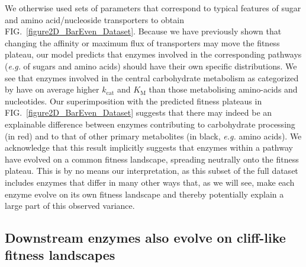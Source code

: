 \documentclass[nogrid,crop,final]{MBE2}%
\begin{document}
We otherwise used sets of parameters that correspond to typical features of sugar and amino acid/nucleoside transporters to obtain FIG.~\ref{figure2D_BarEven_Dataset}. Because we have previously shown that changing the affinity or maximum flux of transporters may move the fitness plateau, our model predicts that enzymes involved in the corresponding pathways (\textit{e.g.} of sugars and amino acids) should have their own specific distributions. We see that enzymes involved in the central carbohydrate metabolism as categorized by \citet{Bar-Even11} have on average higher $k_\text{cat}$ and $K_\text{M}$ than those metabolising amino-acids and nucleotides. Our superimposition with the predicted fitness plateaus in FIG.~\ref{figure2D_BarEven_Dataset} suggests that there may indeed be an explainable difference between enzymes contributing to carbohydrate processing (in red) and to that of other primary metabolites (in black, \textit{e.g.} amino acids).
We acknowledge that this result implicitly suggests that enzymes within a pathway have evolved on a common fitness landscape, spreading neutrally onto the fitness plateau. This is by no means our interpretation, as this subset of the full dataset includes enzymes that differ in many other ways that, as we will see, make each enzyme evolve on its own fitness landscape and thereby potentially explain a large part of this observed variance. 

\subsection{Downstream enzymes also evolve on cliff-like fitness landscapes}
\end{document}
